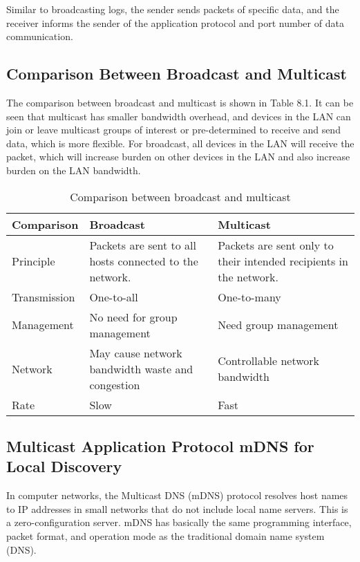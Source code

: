 \documentclass[a4paper,12pt]{book}
\begin{document}
\vspace{6pt}
Similar to broadcasting logs, the sender sends packets of specific data, and the receiver informs the sender of the application protocol and port number of data communication.

\subsection{Comparison Between Broadcast and Multicast}
The comparison between broadcast and multicast is shown in Table 8.1. It can be seen that multicast has smaller bandwidth overhead, and devices in the LAN can join or leave multicast groups of interest or pre-determined to receive and send data, which is more flexible. For broadcast, all devices in the LAN will receive the packet, which will increase burden on other devices in the LAN and also increase burden on the LAN bandwidth.

\begin{table}[h!]
    \renewcommand{\arraystretch}{1.4}
    \caption{Comparison between broadcast and multicast}
    \begin{tabular}{|>{\Centering}m{6em}|>{\Centering}m{16em}|>{\Centering}m{16em}|}
        \hline
        \rowcolor{LightBlue} \textbf{Comparison}&\textbf{Broadcast}&\textbf{Multicast}\\
        \hline
        Principle&Packets are sent to all hosts connected to the network.&Packets are sent only to their intended recipients in the network.\\
        \hline
        Transmission&One-to-all&One-to-many\\
        \hline
        Management&No need for group management&Need group management\\
        \hline
        Network&May cause network bandwidth waste and congestion&Controllable network bandwidth\\
        \hline
        Rate&Slow&Fast\\
        \hline
    \end{tabular}
\end{table}

\subsection{Multicast Application Protocol mDNS for Local Discovery}
In computer networks, the Multicast DNS (mDNS) protocol resolves host names to IP addresses in small networks that do not include local name servers. This is a zero-configuration server. mDNS has basically the same programming interface, packet format, and operation mode as the traditional domain name system (DNS).
\end{document}
